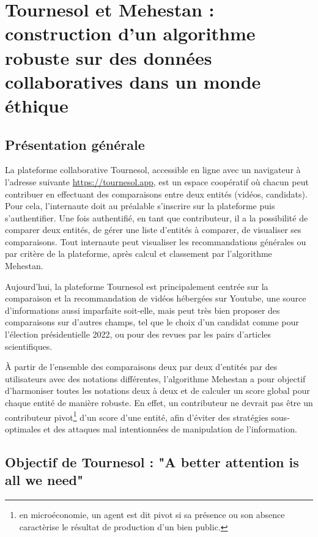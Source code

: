 \section{Tournesol et Mehestan : construction d'un algorithme robuste sur des données collaboratives dans un monde éthique}

\subsection{Présentation générale}

La plateforme collaborative Tournesol, accessible en ligne avec un navigateur à l'adresse suivante \href{https://tournesol.app}{https://tournesol.app}, est un espace coopératif où chacun peut contribuer en effectuant des comparaisons entre deux entités (vidéos, candidats). Pour cela, l'internaute doit au préalable s'inscrire sur la plateforme puis s'authentifier. Une fois authentifié, en tant que contributeur, il a la possibilité de comparer deux entités, de gérer une liste d'entités à comparer, de visualiser ses comparaisons. Tout internaute peut visualiser les recommandations générales ou par critère de la plateforme, après calcul et classement par l'algorithme Mehestan.

Aujourd'hui, la plateforme Tournesol est principalement centrée sur la comparaison et la recommandation de vidéos hébergées sur Youtube, une source d'informations aussi imparfaite soit-elle, mais peut très bien proposer des comparaisons sur d'autres champs, tel que le choix d'un candidat comme pour l'élection présidentielle 2022, ou pour des revues par les pairs d'articles scientifiques.

À partir de l'ensemble des comparaisons deux par deux d'entités par des utilisateurs avec des notations différentes, l'algorithme Mehestan a pour objectif d'harmoniser toutes les notations deux à deux et de calculer un score global pour chaque entité de manière robuste. En effet, un contributeur ne devrait pas être un contributeur pivot\footnote{en microéconomie, un agent est dit pivot si sa présence ou son absence caractèrise le résultat de production d'un bien public.} d'un score d'une entité, afin d'éviter des stratégies sous-optimales et des attaques mal intentionnées de manipulation de l'information.

\subsection{Objectif de Tournesol : "A better attention is all we need"}

